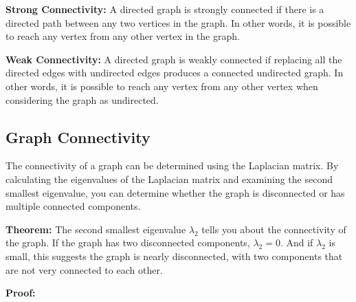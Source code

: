 \documentclass{article}
\begin{document}
\textbf{Strong Connectivity:}
A directed graph is strongly connected if there is a directed path between any two vertices in the graph. In other words, it is possible to reach any vertex from any other vertex in the graph.

\textbf{Weak Connectivity:}
A directed graph is weakly connected if replacing all the directed edges with undirected edges produces a connected undirected graph. In other words, it is possible to reach any vertex from any other vertex when considering the graph as undirected.

\subsection{Graph Connectivity}

The connectivity of a graph can be determined using the Laplacian matrix. By calculating the eigenvalues of the Laplacian matrix and examining the second smallest eigenvalue, you can determine whether the graph is disconnected or has multiple connected components.

\textbf{Theorem:} The second smallest eigenvalue $\lambda_2$ tells you about the connectivity of the graph. If the graph has two disconnected components, $\lambda_2 = 0$. And if $\lambda_2$ is small, this suggests the graph is nearly disconnected, with two components that are not very connected to each other.

\textbf{Proof:}
\end{document}
